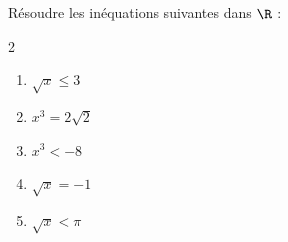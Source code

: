 \begin{exo}{}
	Résoudre les inéquations suivantes dans $\R$ :
	\vspace*{-2mm}
	\begin{multicols}{2}
		\begin{enumerate}[itemsep=2mm]
			\item $\sqrt{x} \le 3$
			\item $x^3 = 2\sqrt{2}$
			\item $x^3 < -8$
			\item $\sqrt{x} = -1$
			\item $\sqrt{x} < \pi$
		\end{enumerate}
	\end{multicols}\vspace*{-2mm}
\end{exo}
